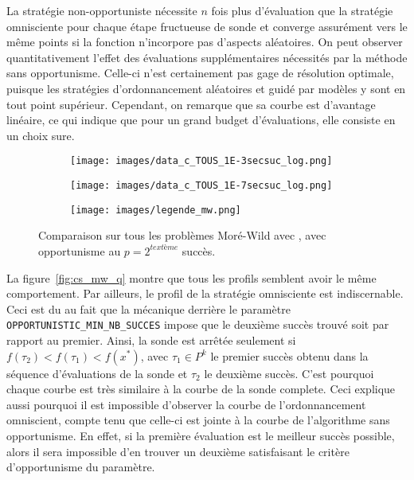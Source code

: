La stratégie non-opportuniste nécessite $n$ fois plus d'évaluation que la stratégie omnisciente pour chaque étape fructueuse de sonde et converge assurément vers le même points si la fonction n'incorpore pas d'aspects aléatoires. On peut observer quantitativement l'effet des évaluations supplémentaires nécessités par la méthode sans opportunisme. Celle-ci n'est certainement pas gage de résolution optimale, puisque les stratégies d'ordonnancement aléatoires et guidé par modèles y sont en tout point supérieur. Cependant, on remarque que sa courbe est d'avantage linéaire, ce qui indique que pour un grand budget d'évaluations, elle consiste en un choix sure. 

\begin{figure}[!htb]\label{fig:cs_mw_q}
	\centering
	\begin{subfigure}{0.43\textwidth}
		\texttt{[image: images/data\_c\_TOUS\_1E-3secsuc\_log.png]}
		\label{fig:data_c_TOUS_1E-3secsuc_log}
	\end{subfigure}%
	\begin{subfigure}{0.43\textwidth}
		\texttt{[image: images/data\_c\_TOUS\_1E-7secsuc\_log.png]}
		\label{fig:data_c_TOUS_1E-7secsuc_log}
	\end{subfigure}
	\smallskip
	\begin{subfigure}{0.95\textwidth}
		\texttt{[image: images/legende\_mw.png]}
	\end{subfigure}
	\caption{Comparaison sur tous les problèmes Moré-Wild avec \CS, avec opportunisme au $p=2^{text{ème}}$ succès.}
\end{figure}

La figure~\ref{fig:cs_mw_q} montre que tous les profils semblent avoir le même comportement. Par ailleurs, le profil de la stratégie omnisciente est indiscernable. Ceci est du au fait que la mécanique derrière le paramètre \texttt{OPPORTUNISTIC\_MIN\_NB\_SUCCES} impose que le deuxième succès trouvé soit par rapport au premier. Ainsi, la sonde est arrêtée seulement si $f(\tau_2) < f(\tau_1) < f(x^*)$, avec $\tau_1 \in P^k$ le premier succès obtenu dans la séquence d'évaluations de la sonde et $\tau_2$ le deuxième succès. C'est pourquoi chaque courbe est très similaire à la courbe de la sonde complete. Ceci explique aussi pourquoi il est impossible d'observer la courbe de l'ordonnancement omniscient, compte tenu que celle-ci est jointe à la courbe de l'algorithme sans opportunisme. En effet, si la première évaluation est le meilleur succès possible, alors il sera impossible d'en trouver un deuxième satisfaisant le critère d'opportunisme du paramètre.

